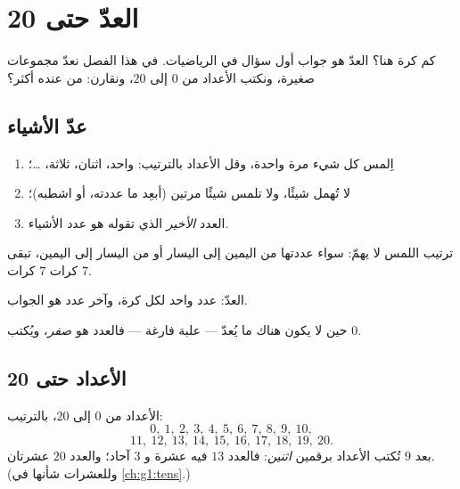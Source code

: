 \chapter{العدّ حتى 20}\label{ch:g1:counting}

كم كرة هنا؟ العدّ هو جواب أول سؤال في الرياضيات. في هذا الفصل نعدّ
مجموعات صغيرة، ونكتب الأعداد من $0$ إلى $20$، ونقارن: من عنده أكثر؟

\section{عدّ الأشياء}

\begin{method}\label{met:g1:counting:how}
\begin{enumerate}
  \item اِلمس كل شيء مرة واحدة، وقل الأعداد بالترتيب: واحد، اثنان،
        ثلاثة، \dots؛
  \item لا تُهمل شيئًا، ولا تلمس شيئًا مرتين (أبعِد ما عددته، أو
        اشطبه)؛
  \item العدد \emph{الأخير} الذي تقوله هو عدد الأشياء.
\end{enumerate}
ترتيب اللمس لا يهمّ: سواء عددتها من اليمين إلى اليسار أو من اليسار
إلى اليمين، تبقى $7$ كرات $7$ كرات.
\end{method}

\begin{omfigure}

{\small العدّ: عدد واحد لكل كرة، وآخر عدد هو
الجواب.}
\end{omfigure}

\begin{definition}[الصفر]\label{def:g1:counting:zero}
حين لا يكون هناك ما يُعدّ --- علبة فارغة --- فالعدد هو
\emph{صفر}، ويُكتب $0$.
\end{definition}

\section{الأعداد حتى 20}

\begin{example}\label{ex:g1:counting:writing}
الأعداد من $0$ إلى $20$، بالترتيب:
\[
0,\ 1,\ 2,\ 3,\ 4,\ 5,\ 6,\ 7,\ 8,\ 9,\ 10,
\]
\[
11,\ 12,\ 13,\ 14,\ 15,\ 16,\ 17,\ 18,\ 19,\ 20 .
\]
بعد $9$ تُكتب الأعداد برقمين \emph{اثنين}: فالعدد $13$ فيه عشرة
و $3$ آحاد؛ والعدد $20$ عشرتان. (وللعشرات شأنها في
\cref{ch:g1:tens}.)
\end{example}

